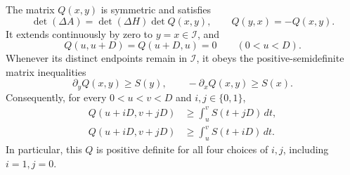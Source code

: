 \begin{proposition}
\label{lag:schur}
The matrix $Q(x,y)$ is symmetric and satisfies
\begin{equation}
 \det(\Delta A)=\det(\Delta H)\det Q(x,y),\qquad
 Q(y,x)=-Q(x,y).
 \label{eq:lag-Schur-factorization}
\end{equation}
It extends continuously by zero to $y=x\in\mathcal I$, and
\begin{equation}
 Q(u,u+D)=Q(u+D,u)=0\qquad(0<u<D).
 \label{eq:lag-Q-zeros}
\end{equation}
Whenever its distinct endpoints remain in $\mathcal I$, it obeys the
positive-semidefinite matrix inequalities
\begin{equation}
 \partial_yQ(x,y)\ge S(y),\qquad
 -\partial_xQ(x,y)\ge S(x).
 \label{eq:lag-Q-derivatives}
\end{equation}
Consequently, for every $0<u<v<D$ and $i,j\in\{0,1\}$,
\begin{align}
 Q(u+iD,v+jD)&\ge\int_u^v S(t+jD)\,dt,
 \label{eq:lag-Q-bound-j}\\
 Q(u+iD,v+jD)&\ge\int_u^v S(t+iD)\,dt.
 \label{eq:lag-Q-bound-i}
\end{align}
In particular, this $Q$ is positive definite for all four choices of
$i,j$, including $i=1,j=0$.
\end{proposition}

